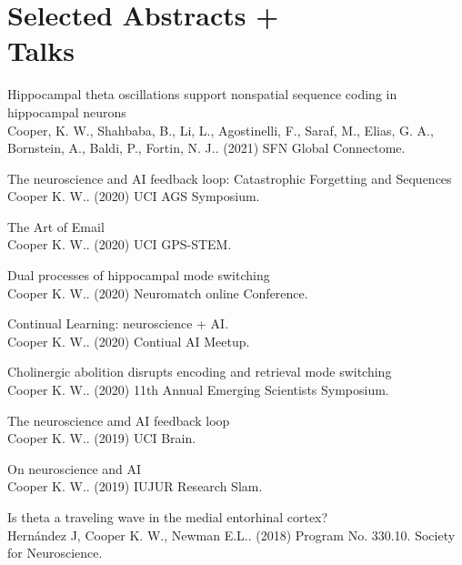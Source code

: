 \documentclass[10pt]{cooperCV2}
\begin{document}
\section{Selected Abstracts +  \\Talks}

 
\begin{etaremune}[itemindent=-1.5\bibhang, topsep=0pt,
				   itemsep=\bibsep,partopsep=0pt,parsep=0pt,leftmargin={\bibhang+\widthof{[999]}}] 
    
    \item Hippocampal theta oscillations support nonspatial sequence coding in hippocampal neurons\\ Cooper, K. W., Shahbaba, B., Li, L., Agostinelli, F., Saraf, M., Elias, G. A., Bornstein, A., Baldi, P.,  Fortin, N. J.. (2021) SFN Global Connectome. 
     
	
    \item The neuroscience and AI feedback loop: Catastrophic Forgetting and Sequences\\ Cooper K. W.. (2020) UCI AGS Symposium. 
     
	
    \item The Art of Email\\ Cooper K. W.. (2020) UCI GPS-STEM. 
     
	
    \item Dual processes of hippocampal mode switching\\ Cooper K. W.. (2020) Neuromatch online Conference. 
     
	
    \item Continual Learning: neuroscience + AI.\\ Cooper K. W.. (2020) Contiual AI Meetup. 
     
	
    \item Cholinergic abolition disrupts encoding and retrieval mode switching\\ Cooper K. W.. (2020) 11th Annual Emerging Scientists Symposium. 
     
	
    \item The neuroscience amd AI feedback loop\\ Cooper K. W.. (2019) UCI Brain. 
     
	
    \item On neuroscience and AI\\ Cooper K. W.. (2019) IUJUR Research Slam. 
     
	
    \item Is theta a traveling wave in the medial entorhinal cortex?\\ Hernández J, Cooper K. W., Newman E.L.. (2018) Program No. 330.10. Society for Neuroscience. 
     

\end{etaremune}
\end{document}

